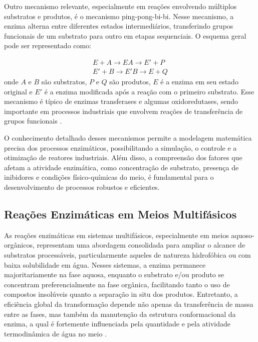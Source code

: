 \documentclass[12pt,oneside]{report}
\begin{document}
Outro mecanismo relevante, especialmente em reações envolvendo múltiplos substratos e produtos, é o mecanismo ping-pong-bi-bi. Nesse mecanismo, a enzima alterna entre diferentes estados intermediários, transferindo grupos funcionais de um substrato para outro em etapas sequenciais. O esquema geral pode ser representado como:

\begin{equation}
    \begin{aligned}
        E + A \rightarrow EA \rightarrow E' + P \\
        E' + B \rightarrow E'B \rightarrow E + Q
    \end{aligned}
\end{equation}
onde $A$ e $B$ são substratos, $P$ e $Q$ são produtos, $E$ é a enzima em seu estado original e $E'$ é a enzima modificada após a reação com o primeiro substrato. Esse mecanismo é típico de enzimas transferases e algumas oxidoredutases, sendo importante em processos industriais que envolvem reações de transferência de grupos funcionais \cite{FOGLER_2016}.

O conhecimento detalhado desses mecanismos permite a modelagem matemática precisa dos processos enzimáticos, possibilitando a simulação, o controle e a otimização de reatores industriais. Além disso, a compreensão dos fatores que afetam a atividade enzimática, como concentração de substrato, presença de inibidores e condições físico-químicas do meio, é fundamental para o desenvolvimento de processos robustos e eficientes.

\subsection{Reações Enzimáticas em Meios Multifásicos}

As reações enzimáticas em sistemas multifásicos, especialmente em meios aquoso-orgânicos, representam uma abordagem consolidada para ampliar o alcance de substratos processáveis, particularmente aqueles de natureza hidrofóbica ou com baixa solubilidade em água. Nesses sistemas, a enzima permanece majoritariamente na fase aquosa, enquanto o substrato e/ou produto se concentram preferencialmente na fase orgânica, facilitando tanto o uso de compostos insolúveis quanto a separação in situ dos produtos. Entretanto, a eficiência global da transformação depende não apenas da transferência de massa entre as fases, mas também da manutenção da estrutura conformacional da enzima, a qual é fortemente influenciada pela quantidade e pela atividade termodinâmica de água no meio \cite{verger_action_1973} \cite{reis_lipases_2009}.
\end{document}
